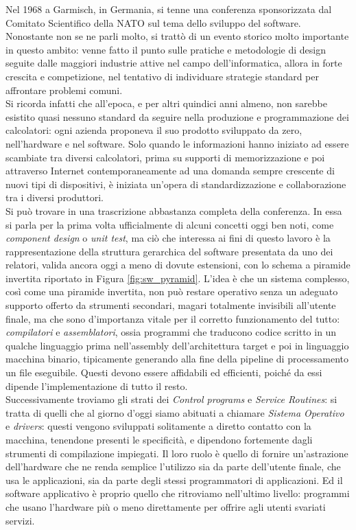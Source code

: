 \indent Nel 1968 a Garmisch, in Germania, si tenne una conferenza sponsorizzata dal Comitato Scientifico della NATO sul tema dello sviluppo del software. Nonostante non se ne parli molto, si trattò di un evento storico molto importante in questo ambito: venne fatto il punto sulle pratiche e metodologie di design seguite dalle maggiori industrie attive nel campo dell'informatica, allora in forte crescita e competizione, nel tentativo di individuare strategie standard per affrontare problemi comuni.\\
Si ricorda infatti che all'epoca, e per altri quindici anni almeno, non sarebbe esistito quasi nessuno standard da seguire nella produzione e programmazione dei calcolatori: ogni azienda proponeva il suo prodotto sviluppato da zero, nell'hardware e nel software. Solo quando le informazioni hanno iniziato ad essere scambiate tra diversi calcolatori, prima su supporti di memorizzazione e poi attraverso Internet contemporaneamente ad una domanda sempre crescente di nuovi tipi di dispositivi, è iniziata un'opera di standardizzazione e collaborazione tra i diversi produttori.\\
Si può trovare in \cite{middleware} una trascrizione abbastanza completa della conferenza. In essa si parla per la prima volta ufficialmente di alcuni concetti oggi ben noti, come \emph{component design} o \emph{unit test}, ma ciò che interessa ai fini di questo lavoro è la rappresentazione della struttura gerarchica del software presentata da uno dei relatori, valida ancora oggi a meno di dovute estensioni, con lo schema a piramide invertita riportato in Figura \ref{fig:sw_pyramid}. L'idea è che un sistema complesso, così come una piramide invertita, non può restare operativo senza un adeguato supporto offerto da strumenti secondari, magari totalmente invisibili all'utente finale, ma che sono d'importanza vitale per il corretto funzionamento del tutto: \emph{compilatori} e \emph{assemblatori}, ossia programmi che traducono codice scritto in un qualche linguaggio prima nell'assembly dell'architettura target e poi in linguaggio macchina binario, tipicamente generando alla fine della pipeline di processamento un file eseguibile. Questi devono essere affidabili ed efficienti, poiché da essi dipende l'implementazione di tutto il resto.\\
Successivamente troviamo gli strati dei \emph{Control programs} e \emph{Service Routines}: si tratta di quelli che al giorno d'oggi siamo abituati a chiamare \emph{Sistema Operativo} e \emph{drivers}: questi vengono sviluppati solitamente a diretto contatto con la macchina, tenendone presenti le specificità, e dipendono fortemente dagli strumenti di compilazione impiegati. Il loro ruolo è quello di fornire un'astrazione dell'hardware che ne renda semplice l'utilizzo sia da parte dell'utente finale, che usa le applicazioni, sia da parte degli stessi programmatori di applicazioni. Ed il software applicativo è proprio quello che ritroviamo nell'ultimo livello: programmi che usano l'hardware più o meno direttamente per offrire agli utenti svariati servizi.\\
